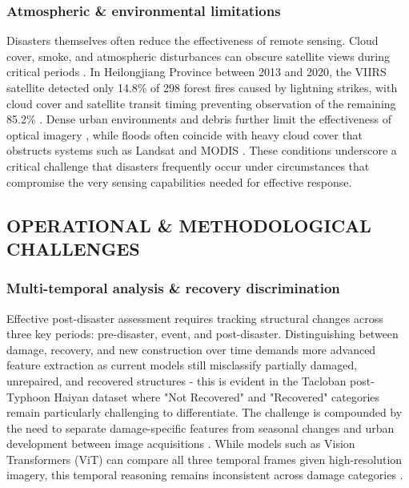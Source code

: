 \documentclass[conference,a4paper]{IEEEtran}
\begin{document}
\subsubsection{\textbf{Atmospheric \& environmental limitations}}
Disasters themselves often reduce the effectiveness of remote sensing. Cloud cover, smoke, and atmospheric disturbances can obscure satellite views during critical periods \cite{lagapEnhancingPostDisasterDamage2025}. In Heilongjiang Province between 2013 and 2020, the VIIRS satellite detected only 14.8\% of 298 forest fires caused by lightning strikes, with cloud cover and satellite transit timing preventing observation of the remaining 85.2\% \cite{jiaoForestFirePatterns2023}. Dense urban environments and debris further limit the effectiveness of optical imagery \cite{lagapEnhancingPostDisasterDamage2025}, while floods often coincide with heavy cloud cover that obstructs systems such as Landsat and MODIS \cite{teohExploringGenerativeAI2024}. These conditions underscore a critical challenge that disasters frequently occur under circumstances that compromise the very sensing capabilities needed for effective response.


\subsection{OPERATIONAL \& METHODOLOGICAL CHALLENGES}

\subsubsection{\textbf{Multi-temporal analysis \& recovery discrimination}}
Effective post-disaster assessment requires tracking structural changes across three key periods: pre-disaster, event, and post-disaster. Distinguishing between damage, recovery, and new construction over time demands more advanced feature extraction as current models still misclassify partially damaged, unrepaired, and recovered structures - this is evident in the Tacloban post-Typhoon Haiyan dataset where "Not Recovered" and "Recovered" categories remain particularly challenging to differentiate. The challenge is compounded by the need to separate damage-specific features from seasonal changes and urban development between image acquisitions \cite{kimDisasterAssessmentUsing2022}. While models such as Vision Transformers (ViT) can compare all three temporal frames given high-resolution imagery, this temporal reasoning remains inconsistent across damage categories \cite{lagapEnhancingPostDisasterDamage2025}.
\end{document}
